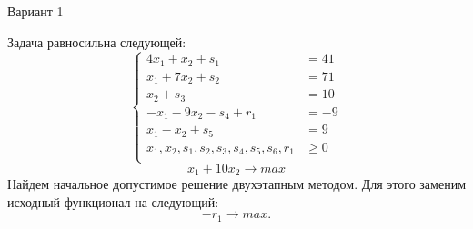 \documentclass{article}%
\begin{document}
%
\normalsize%
\begin{center}%
\begin{Huge}%
Вариант 1%
\end{Huge}%
\end{center}%
Задача равносильна следующей: %
\[%
\left\{\begin{aligned}4x_{1}+x_{2}+s_{1} & =41 \\x_{1}+7x_{2}+s_{2} & =71 \\x_{2}+s_{3} & =10 \\-x_{1}-9x_{2}-s_{4}+r_{1} & =-9 \\x_{1}-x_{2}+s_{5} & =9 \\x_{1},x_{2},s_{1},s_{2},s_{3},s_{4},s_{5},s_{6},r_{1} & \ge 0 \\ \end{aligned}\right.%
\]%
\[%
x_{1}+10x_{2}  \to max%
\]%
Найдем начальное допустимое решение двухэтапным методом. Для этого заменим исходный функционал на следующий: %
\[%
-r_{1}\to max.%
\]%
\end{document}
